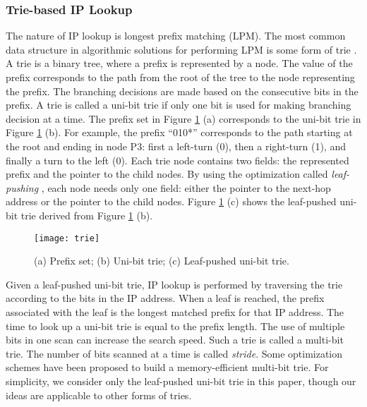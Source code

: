 \documentclass{sigcomm-alternate}
\begin{document}
\subsubsection{Trie-based IP Lookup} 
The nature of IP lookup is longest prefix matching (LPM). The most common data structure in algorithmic solutions for performing LPM is some form of trie \cite{networkmag01:sanchez}. A trie is a binary tree, where a prefix is represented by a node. The value of the prefix corresponds to the path from the root of the tree to the node representing the prefix. The branching decisions are made based on the consecutive bits in the prefix. A trie is called a uni-bit trie if only one bit is used for making branching decision at a time. The prefix set in Figure \ref{fig:trie} (a) corresponds to the uni-bit trie in Figure \ref{fig:trie} (b). For example, the prefix ``010*'' corresponds to the path starting at the root and ending in node P3: first a left-turn (0), then a right-turn (1), and finally a turn to the left (0). Each trie node contains two fields: the represented prefix and the pointer to the child nodes. By using the optimization called \textit{leaf-pushing} \cite{tocs99:srinivasan}, each node needs only one field: either the pointer to the next-hop address or the pointer to the child nodes. Figure \ref{fig:trie} (c) shows the leaf-pushed uni-bit trie derived from Figure \ref{fig:trie} (b). 
\begin{figure}[htb]
\centering
\texttt{[image: trie]}
\caption{(a) Prefix set; (b) Uni-bit trie; (c) Leaf-pushed uni-bit trie.}
\label{fig:trie}
\end{figure}

Given a leaf-pushed uni-bit trie, IP lookup is performed by traversing the trie according to the bits in the IP address. When a leaf is reached, the prefix associated with the leaf is the longest matched prefix for that IP address. The time to look up a uni-bit trie is equal to the prefix length. The use of multiple bits in one scan can increase the search speed. Such a trie is called a multi-bit trie. The number of bits scanned at a time is called \textit{stride}. Some optimization schemes \cite{sigcommccr04:eatherton, toc07:kim} have been proposed to build a memory-efficient multi-bit trie. For simplicity, we consider only the leaf-pushed uni-bit trie in this paper, though our ideas are applicable to other forms of tries.
\end{document}
